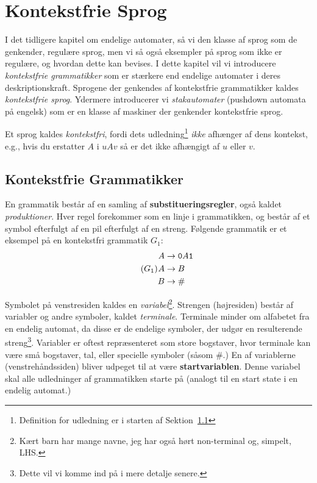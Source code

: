 \chapter{Kontekstfrie Sprog}

I det tidligere kapitel om endelige automater, så vi den klasse af sprog som de genkender, regulære sprog, men vi så også eksempler på sprog som ikke er regulære, og hvordan dette kan bevises. I dette kapitel vil vi introducere \textit{kontekstfrie grammatikker} som er stærkere end endelige automater i deres deskriptionskraft. Sprogene der genkendes af kontekstfrie grammatikker kaldes \textit{kontekstfrie sprog}. Ydermere introducerer vi \textit{stakautomater} (pushdown automata på engelsk) som er en klasse af maskiner der genkender kontekstfrie sprog.

Et sprog kaldes \textit{kontekstfri}, fordi dets udledning\footnote{Definition for udledning  er i starten af Sektion~\ref{sec:cfg}} \textit{ikke} afhænger af dens kontekst, e.g., hvis du erstatter $A$ i $uAv$ så er det ikke afhængigt af $u$ eller $v$.

\section{Kontekstfrie Grammatikker}
\label{sec:cfg}
En grammatik består af en samling af \textbf{substitueringsregler}, også kaldet \textit{produktioner}. Hver regel forekommer som en linje i grammatikken,  og består af et symbol efterfulgt af en pil efterfulgt af en streng. Følgende grammatik er et eksempel på en kontekstfri grammatik $G_{1}$:
\begin{equation}
  \tag{$G_{1}$}
  \begin{split}
  A &\rightarrow \mathtt{0}A \mathtt{1}\\
  A &\rightarrow B\\
  B &\rightarrow \mathtt{\#}
\end{split}
  \label{eqn:G1}
\end{equation}

Symbolet på venstresiden kaldes en \textit{variabel}\footnote{Kært barn har mange navne, jeg har også hørt non-terminal og, simpelt, LHS.}. Strengen (højresiden) består af variabler og andre symboler, kaldet \textit{terminale}. Terminale minder om alfabetet fra en endelig automat, da disse er de endelige symboler, der udgør en resulterende streng\footnote{Dette vil vi komme ind på i mere detalje senere.}. Variabler er oftest repræsenteret som store bogstaver, hvor terminale kan være små bogstaver, tal, eller specielle symboler (såsom \#.) En af variablerne (venstrehåndssiden) bliver udpeget til at være \textbf{startvariablen}. Denne variabel skal alle udledninger af grammatikken starte på (analogt til en start state i en endelig automat.)

